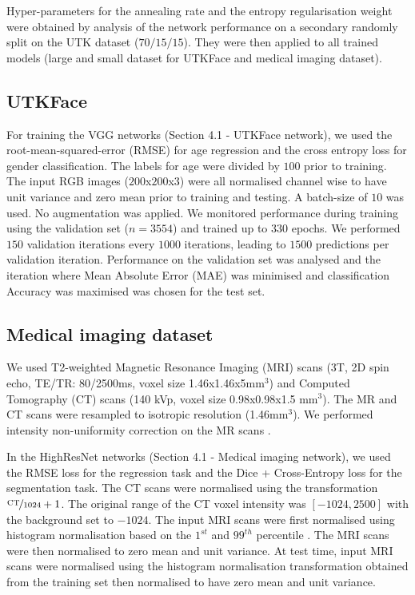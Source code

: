 Hyper-parameters for the annealing rate and the entropy regularisation weight were obtained by analysis of the network performance on a secondary randomly split on the UTK dataset ($70/15/15$). They were then applied to all trained models (large and small dataset for UTKFace and medical imaging dataset).

\subsection{UTKFace}
For training the VGG networks (Section 4.1 - UTKFace network), we used the root-mean-squared-error (RMSE) for age regression and the cross entropy loss for gender classification. The labels for age were divided by $100$ prior to training. The input RGB images ($200$x$200$x$3$) were all normalised channel wise to have unit variance and zero mean prior to training and testing. A batch-size of $10$ was used. No augmentation was applied. We monitored performance during training using the validation set ($n=3554$) and trained up to $330$ epochs. We performed $150$ validation iterations every $1000$ iterations, leading to $1500$ predictions per validation iteration. Performance on the validation set was analysed and the iteration where Mean Absolute Error (MAE) was minimised and classification Accuracy was maximised was chosen for the test set.

\subsection{Medical imaging dataset}
We used T2-weighted Magnetic Resonance Imaging (MRI) scans (3T, 2D spin echo, TE/TR: 80/2500ms, voxel size 1.46x1.46x5mm$^{3}$) and Computed Tomography (CT) scans (140 kVp, voxel size 0.98x0.98x1.5 mm$^{3}$). The MR and CT scans were resampled to isotropic resolution (1.46mm$^{3}$). We performed intensity non-uniformity correction on the MR scans \cite{Tustison2010}.

In the HighResNet networks (Section 4.1 - Medical imaging network), we used the RMSE loss for the regression task and the Dice + Cross-Entropy loss \cite{dicex} for the segmentation task. The CT scans were normalised using the transformation $\nicefrac{\text{CT}}{1024} + 1$. The original range of the CT voxel intensity was $[-1024,2500]$ with the background set to $-1024$. The input MRI scans were first normalised using histogram normalisation based on the $1^{st}$ and $99^{th}$ percentile \cite{Nyul2000}. The MRI scans were then normalised to zero mean and unit variance. At test time, input MRI scans were normalised using the histogram normalisation transformation obtained from the training set then normalised to have zero mean and unit variance. 

